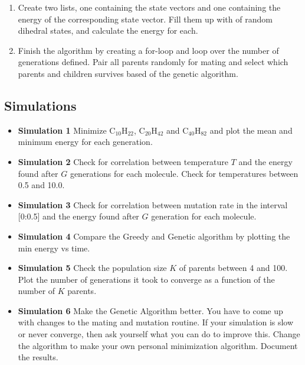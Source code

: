 \documentclass{article}
\begin{document}
\begin{enumerate}
    \item Create two lists, one containing the state vectors
    and one containing the energy of the corresponding state vector.
    Fill them up with  of random dihedral states,
    and calculate the energy for each.

    \item Finish the algorithm by creating a for-loop and loop over the number of generations defined.
          Pair all parents randomly for mating and select which parents and children survives based of the genetic algorithm.



\end{enumerate}


\subsection{Simulations}

\begin{itemize}
    \item {\bf Simulation 1}\newline
      Minimize
      C$_{10}$H$_{22}$,
      C$_{20}$H$_{42}$ and
      C$_{40}$H$_{82}$
      and plot the mean and minimum energy for
      each generation.

    \item {\bf Simulation 2}\newline
      Check for correlation between temperature $T$ and the energy found after $G$ generations for each molecule.
      Check for temperatures between 0.5 and 10.0.

    \item {\bf Simulation 3}\newline
      Check for correlation between mutation rate in the interval [0:0.5] and the energy found after $G$ generation for each molecule.

    \item {\bf Simulation 4}\newline
      Compare the Greedy and Genetic algorithm by plotting the min energy vs time.

    \item {\bf Simulation 5}\newline
      Check the population size $K$ of parents between 4 and 100.
      Plot the number of generations it took to converge as a function of the number of $K$ parents.

    \item {\bf Simulation 6}\newline
      Make the Genetic Algorithm better.
      You have to come up with changes to the mating and mutation routine.
      If your simulation is slow or never converge, then ask yourself what you can do to improve this.
      Change the algorithm to make your own personal minimization algorithm.
      Document the results.


\end{itemize}



\end{document}
